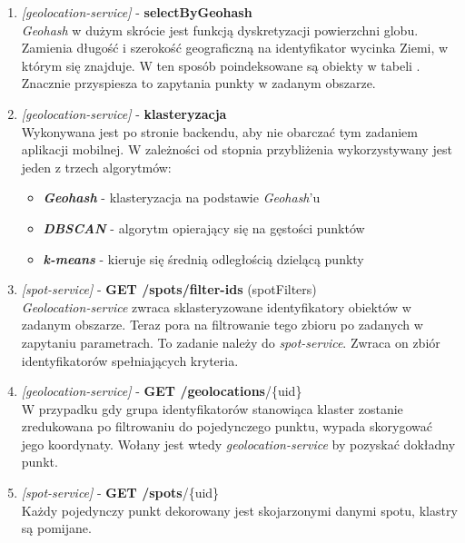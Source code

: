 \begin{enumerate}
    \item
    \large\emph{[geolocation-service]} - \textbf{selectByGeohash}\normalsize\\
    \emph{Geohash} w dużym skrócie jest funkcją dyskretyzacji powierzchni globu.
    Zamienia długość i szerokość geograficzną na identyfikator wycinka Ziemi, w którym się znajduje.
    W ten sposób poindeksowane są obiekty w tabeli . Znacznie przyspiesza to zapytania punkty w zadanym obszarze.

    \item
    \large\emph{[geolocation-service]} - \textbf{klasteryzacja}\normalsize\\
    Wykonywana jest po stronie backendu, aby nie obarczać tym zadaniem aplikacji mobilnej. 
    W zależności od stopnia przybliżenia wykorzystywany jest jeden z trzech algorytmów:

    \begin{itemize}
        \item
        \textbf{\emph{Geohash}} - klasteryzacja na podstawie \emph{Geohash}'u

        \item
        \textbf{\emph{DBSCAN}} - algorytm opierający się na gęstości punktów

        \item
        \textbf{\emph{k-means}} - kieruje się średnią odległością dzielącą punkty

    \end{itemize} 
    

    \item
    \large{\emph{[spot-service]} - \textbf{GET /spots/filter-ids} (spotFilters)}\normalsize\\
    \emph{Geolocation-service} zwraca sklasteryzowane identyfikatory obiektów w zadanym obszarze.
    Teraz pora na filtrowanie tego zbioru po zadanych w zapytaniu parametrach.
    To zadanie należy do \emph{spot-service}. Zwraca on zbiór identyfikatorów spełniających kryteria.

    \item
    \large{\emph{[geolocation-service]} - \textbf{GET /geolocations}/\{uid\}}\normalsize\\
    W przypadku gdy grupa identyfikatorów stanowiąca klaster zostanie zredukowana po filtrowaniu do pojedynczego punktu, wypada skorygować jego koordynaty.
    Wołany jest wtedy \emph{geolocation-service} by pozyskać dokładny punkt.

    \item
    \large{\emph{[spot-service]} - \textbf{GET /spots}/\{uid\}}\normalsize\\
    Każdy pojedynczy punkt dekorowany jest skojarzonymi danymi spotu, klastry są pomijane.


\end{enumerate}
